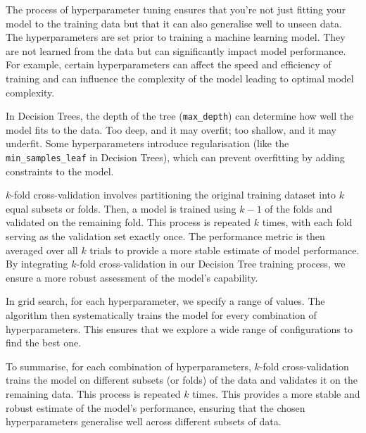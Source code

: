 \documentclass[a4paper,12pt,titlepage]{article}
\numberwithin{equation}{section}
\begin{document}
The process of hyperparameter tuning ensures that you're not just fitting your model to the training data but 
that it can also generalise well to unseen data. The hyperparameters are  set prior to training a machine 
learning model. They are not learned from the data but can significantly impact model performance. 
For example, certain hyperparameters can affect the speed and efficiency of training and can influence 
the complexity of the model leading to optimal model complexity. \newline \par \noindent In Decision Trees, 
the depth of the tree (\texttt{max\_depth}) can determine how well the model fits to the data. Too deep, and it may 
overfit; too shallow, and it may underfit. Some hyperparameters introduce regularisation (like the \texttt{min\_samples\_leaf} in 
Decision Trees), which can prevent overfitting by adding constraints to the model. \newline \par \noindent $k$-fold cross-validation 
involves partitioning the original training dataset into $k$ equal subsets or folds. Then, a model is 
trained using $k-1$ of the folds and validated on the remaining fold. This process is repeated $k$ times, 
with each fold serving as the validation set exactly once. The performance metric is then averaged over all $k$ 
trials to provide a more stable estimate of model performance. By integrating $k$-fold cross-validation in our 
Decision Tree training process, we ensure a more robust assessment of the model's capability. \newline \par \noindent In grid search, 
for each hyperparameter, we specify a range of values. The algorithm then systematically trains the model 
for every combination of hyperparameters. This ensures that we explore a wide range of configurations to 
find the best one. \newline \par \noindent To summarise, for each combination of hyperparameters, 
$k$-fold cross-validation trains the model on different subsets (or folds) of the data and validates it on 
the remaining data. This process is repeated $k$ times. This provides a more stable and robust estimate of 
the model's performance, ensuring that the chosen hyperparameters generalise well across different subsets 
of data.
\end{document}
